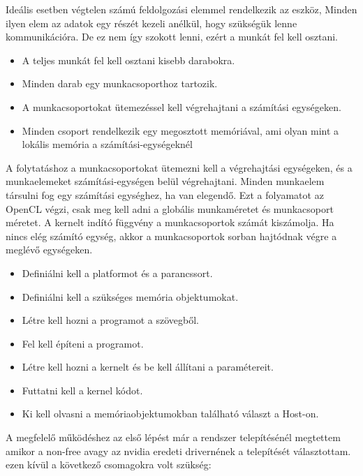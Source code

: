 
Ideális esetben végtelen számú feldolgozási elemmel rendelkezik az eszköz, Minden ilyen elem az adatok egy részét kezeli anélkül, hogy szükségük lenne kommunikációra. De ez nem így szokott lenni, ezért a munkát fel kell osztani.
\begin{itemize}
\item A teljes munkát fel kell osztani kisebb darabokra.
\item Minden darab egy munkacsoporthoz tartozik.
\item A munkacsoportokat ütemezéssel kell végrehajtani a számítási egységeken.
\item Minden csoport rendelkezik egy megosztott memóriával, ami olyan mint a lokális memória a számítási-egységeknél
\end{itemize}

A folytatáshoz a munkacsoportokat ütemezni kell a végrehajtási egységeken, és a munkaelemeket számítási-egységen belül végrehajtani.
Minden munkaelem társulni fog egy számítási egységhez, ha van elegendő. Ezt a folyamatot az OpenCL végzi, csak meg kell adni a globális munkaméretet és munkacsoport méretet. A kernelt indító függvény a  munkacsoportok számát kiszámolja. Ha nincs elég számító egység, akkor a munkacsoportok sorban hajtódnak végre a meglévő egységeken.

\begin{itemize}
\item Definiálni kell a platformot és a parancssort.
\item Definiálni kell a szükséges memória objektumokat.
\item Létre kell hozni a programot a szövegből.
\item Fel kell építeni a programot.
\item Létre kell hozni a kernelt és be kell állítani a paramétereit.
\item Futtatni kell a kernel kódot.
\item Ki kell olvasni a memóriaobjektumokban található választ a Host-on.

\end{itemize}



A megfelelő működéshez az első lépést már a rendszer telepítésénél megtettem amikor a non-free avagy az nvidia eredeti drivernének a telepítését választottam.
ezen kívül a következő csomagokra volt szükség: 

